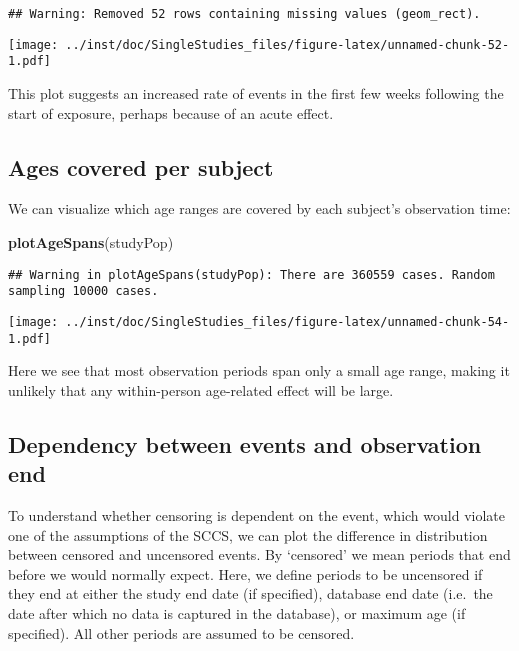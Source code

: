 \documentclass[
]{article}
\newenvironment{Shaded}{\begin{snugshade}}{\end{snugshade}}
\newcommand{\KeywordTok}[1]{\textcolor[rgb]{0.13,0.29,0.53}{\textbf{#1}}}
\newcommand{\NormalTok}[1]{#1}
\begin{document}
\begin{verbatim}
## Warning: Removed 52 rows containing missing values (geom_rect).
\end{verbatim}

\texttt{[image: ../inst/doc/SingleStudies\_files/figure-latex/unnamed-chunk-52-1.pdf]}

This plot suggests an increased rate of events in the first few weeks
following the start of exposure, perhaps because of an acute effect.

\hypertarget{ages-covered-per-subject}{%
\subsection{Ages covered per subject}\label{ages-covered-per-subject}}

We can visualize which age ranges are covered by each subject's
observation time:

\begin{Shaded}
\begin{Highlighting}[]
\KeywordTok{plotAgeSpans}\NormalTok{(studyPop)}
\end{Highlighting}
\end{Shaded}

\begin{verbatim}
## Warning in plotAgeSpans(studyPop): There are 360559 cases. Random sampling 10000 cases.
\end{verbatim}

\texttt{[image: ../inst/doc/SingleStudies\_files/figure-latex/unnamed-chunk-54-1.pdf]}

Here we see that most observation periods span only a small age range,
making it unlikely that any within-person age-related effect will be
large.

\hypertarget{dependency-between-events-and-observation-end}{%
\subsection{Dependency between events and observation
end}\label{dependency-between-events-and-observation-end}}

To understand whether censoring is dependent on the event, which would
violate one of the assumptions of the SCCS, we can plot the difference
in distribution between censored and uncensored events. By `censored' we
mean periods that end before we would normally expect. Here, we define
periods to be uncensored if they end at either the study end date (if
specified), database end date (i.e.~the date after which no data is
captured in the database), or maximum age (if specified). All other
periods are assumed to be censored.
\end{document}
